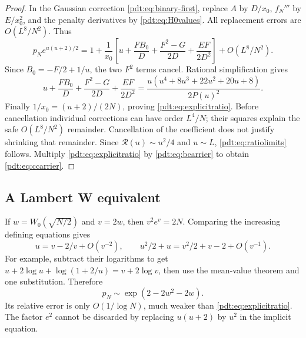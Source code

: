 \begin{proof}
In the Gaussian correction \eqref{pdt:eq:binary-first}, replace $A$ by $D/x_0$, $f_N'''$ by $E/x_0^2$, and the penalty derivatives by \eqref{pdt:eq:H0values}. All replacement errors are $O(L^8/N^2)$. Thus
\begin{equation}\label{pdt:eq:rational-pre}
 p_Ne^{u(u+2)/2}
 =1+\frac1{x_0}\left[u+\frac{FB_0}D+\frac{F^2-G}{2D}
                              +\frac{EF}{2D^2}\right]+O(L^8/N^2).
\end{equation}
Since $B_0=-F/2+1/u$, the two $F^2$ terms cancel. Rational simplification gives
\[
 u+\frac{FB_0}D+\frac{F^2-G}{2D}+\frac{EF}{2D^2}
 =\frac{u(u^4+8u^3+22u^2+20u+8)}{2P(u)^2}.
\]
Finally $1/x_0=(u+2)/(2N)$, proving \eqref{pdt:eq:explicitratio}. Before cancellation individual corrections can have order $L^4/N$; their squares explain the safe $O(L^8/N^2)$ remainder. Cancellation of the coefficient does not justify shrinking that remainder. Since $\mathcal R(u)\sim u^2/4$ and $u\sim L$, \eqref{pdt:eq:ratiolimits} follows. Multiply \eqref{pdt:eq:explicitratio} by \eqref{pdt:eq:bcarrier} to obtain \eqref{pdt:eq:ccarrier}.
\end{proof}

\subsection{A Lambert W equivalent}
If $w=W_0(\sqrt{N/2})$ and $v=2w$, then $v^2e^v=2N$. Comparing the increasing defining equations gives
\[
 u=v-2/v+O(v^{-2}),\qquad
 u^2/2+u=v^2/2+v-2+O(v^{-1}).
\]
For example, subtract their logarithms to get
$u+2\log u+\log(1+2/u)=v+2\log v$, then use the mean-value theorem and one substitution. Therefore
\begin{equation}\label{pdt:eq:Wratio}
 p_N\sim\exp(2-2w^2-2w).
\end{equation}
Its relative error is only $O(1/\log N)$, much weaker than \eqref{pdt:eq:explicitratio}. The factor $e^2$ cannot be discarded by replacing $u(u+2)$ by $u^2$ in the implicit equation.

